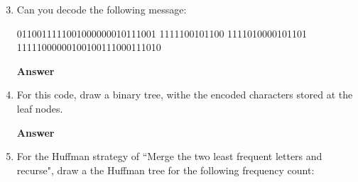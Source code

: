 \documentclass{article}
\begin{document}
\begin{enumerate}\setcounter{enumi}{2}

    \item Can you decode the following message:

            0110011111001000000010111001%
            1111100101100%
            1111010000101101%
            11111000000100100111000111010

        \textbf{Answer}
        \vspace{1in}

    \pagebreak
    \item For this code, draw a binary tree, withe the encoded characters stored at the leaf
        nodes.

        \textbf{Answer}
        \vspace{1in}

    \item For the Huffman strategy of ``Merge the two least frequent letters and
        recurse", draw a the Huffman tree for the following frequency count:


\end{enumerate}
\end{document}
